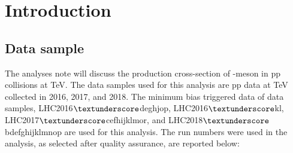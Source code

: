 
\section{Introduction}


 
 
\subsection{Data sample}
\label{sec:data_sample}
The analyses note will discuss the production cross-section of \Dstar -meson in pp collisions at  TeV. The data samples used for this analysis are pp data at  TeV collected in 2016, 2017, and 2018. The minimum bias triggered data of data samples, LHC2016$\textunderscore$deghjop, LHC2016$\textunderscore$kl, LHC2017$\textunderscore$cefhijklmor, and LHC2018$\textunderscore$bdefghijklmnop are used for this analysis. The run numbers were used in the analysis, as selected after quality assurance, are reported below:
 




